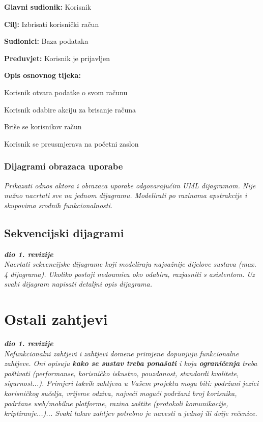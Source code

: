 \noindent {}
\begin{packed_item}
	
	\item \textbf{Glavni sudionik:} Korisnik
	\item  \textbf{Cilj:} Izbrisati korisnički račun
	\item  \textbf{Sudionici:} Baza podataka
	\item  \textbf{Preduvjet:} Korisnik je prijavljen
	\item  \textbf{Opis osnovnog tijeka:}
	
	\item[] \begin{packed_enum}
		
		\item Korisnik otvara podatke o svom računu
		\item Korisnik odabire akciju za brisanje računa
		\item Briše se korisnikov račun
		\item Korisnik se preusmjerava na početni zaslon
		
	\end{packed_enum}
\end{packed_item}

\subsubsection{Dijagrami obrazaca uporabe}

\textit{Prikazati odnos aktora i obrazaca uporabe odgovarajućim UML dijagramom. Nije nužno nacrtati sve na jednom dijagramu. Modelirati po razinama apstrakcije i skupovima srodnih funkcionalnosti.}
\eject		

\subsection{Sekvencijski dijagrami}

\textbf{\textit{dio 1. revizije}}\\

\textit{Nacrtati sekvencijske dijagrame koji modeliraju najvažnije dijelove sustava (max. 4 dijagrama). Ukoliko postoji nedoumica oko odabira, razjasniti s asistentom. Uz svaki dijagram napisati detaljni opis dijagrama.}
\eject

\section{Ostali zahtjevi}

\textbf{\textit{dio 1. revizije}}\\

\textit{Nefunkcionalni zahtjevi i zahtjevi domene primjene dopunjuju funkcionalne zahtjeve. Oni opisuju \textbf{kako se sustav treba ponašati} i koja \textbf{ograničenja} treba poštivati (performanse, korisničko iskustvo, pouzdanost, standardi kvalitete, sigurnost...). Primjeri takvih zahtjeva u Vašem projektu mogu biti: podržani jezici korisničkog sučelja, vrijeme odziva, najveći mogući podržani broj korisnika, podržane web/mobilne platforme, razina zaštite (protokoli komunikacije, kriptiranje...)... Svaki takav zahtjev potrebno je navesti u jednoj ili dvije rečenice.}